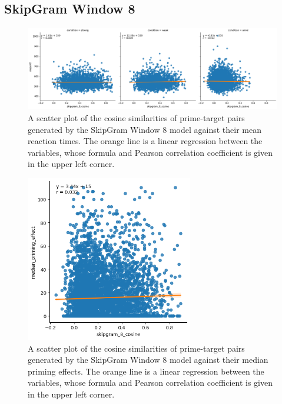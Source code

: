 \documentclass{IEEEtran}
\begin{document}
\subsection*{SkipGram Window 8}
\begin{figure}[h]
    \centering
    \includegraphics[width=\textwidth]{images/skipgram_8_cosine_against_meanrt.png}
    \caption{A scatter plot of the cosine similarities of prime-target pairs generated by the SkipGram Window 8 model against their mean reaction times. The orange line is a linear regression between the variables, whose formula and Pearson correlation coefficient is given in the upper left corner.}
\end{figure}
\begin{figure}[h]
    \centering
    \includegraphics[width=0.65\textwidth]{images/skipgram_8_cosine_against_priming_effect.png}
    \caption{A scatter plot of the cosine similarities of prime-target pairs generated by the SkipGram Window 8 model against their median priming effects. The orange line is a linear regression between the variables, whose formula and Pearson correlation coefficient is given in the upper left corner.}
\end{figure}
\end{document}

